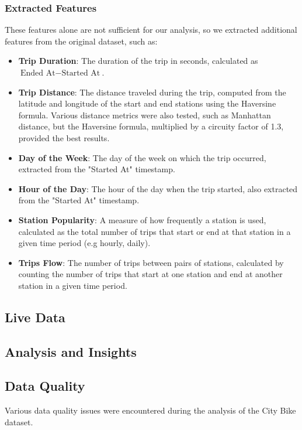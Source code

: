 \subsubsection{Extracted Features}
These features alone are not sufficient for our analysis, so we extracted additional features from the original dataset, such as:
\begin{itemize}
    \item \textbf{Trip Duration}: The duration of the trip in seconds, calculated as $\text{Ended At} - \text{Started At}$.
    \item \textbf{Trip Distance}: The distance traveled during the trip, computed from the latitude and longitude of the start and end stations using the Haversine formula.
    Various distance metrics were also tested, such as Manhattan distance, but the Haversine formula, multiplied by a circuity factor of 1.3, provided the best results.
    \item \textbf{Day of the Week}: The day of the week on which the trip occurred, extracted from the "Started At" timestamp. 
    \item \textbf{Hour of the Day}: The hour of the day when the trip started, also extracted from the "Started At" timestamp.
    \item \textbf{Station Popularity}: A measure of how frequently a station is used, calculated as the total number of trips that start or end at that station in a given time period
    (e.g hourly, daily).
    \item \textbf{Trips Flow}: The number of trips between pairs of stations, calculated by counting the number of trips that start at one station and end at another station in a given time period.
\end{itemize}

\subsection{Live Data}

\subsection{Analysis and Insights}

\subsection{Data Quality}
Various data quality issues were encountered during the analysis of the City Bike dataset.


